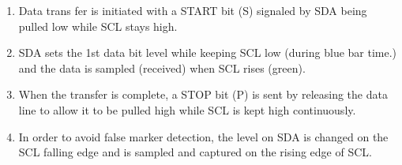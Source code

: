 \begin{enumerate}
\item Data trans fer is initiated with a START bit (S) signaled by SDA being
pulled low while SCL stays high.
\item SDA sets the 1st data bit level while keeping SCL low (during blue bar
time.) and the data is sampled (received) when SCL rises (green).
\item When the transfer is complete, a STOP bit (P) is sent by releasing the
data line to allow it to be pulled high while SCL is kept high continuously.
\item In order to avoid false marker detection, the level on SDA is changed on
the SCL falling edge and is sampled and captured on the rising edge of SCL.
\end{enumerate}








